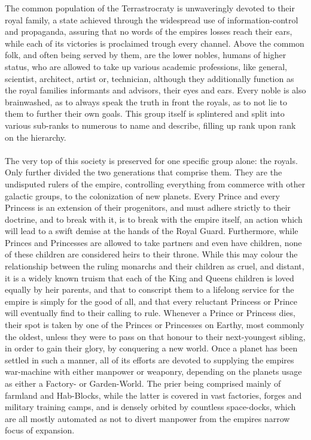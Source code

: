 \documentclass[a4paper,12pt]{report}
\begin{document}
The common population of the Terrastrocraty is unwaveringly devoted to their royal family, a state achieved through the widespread use of information-control and propaganda, assuring that no words of the empires losses reach their ears, while each of its victories is proclaimed trough every channel. Above the common folk, and often being served by them, are the lower nobles, humans of higher status, who are allowed to take up various academic professions, like general, scientist, architect, artist or, technician, although they additionally function as the royal families informants and advisors, their eyes and ears. Every noble is also brainwashed, as to always speak the truth in front the royals, as to not lie to them to further their own goals. This group itself is splintered and split into various sub-ranks to numerous to name and describe, filling up rank upon rank on the hierarchy.\\
\\
The very top of this society is preserved for one specific group alone: the royals. Only further divided the two generations that comprise them. They are the undisputed rulers of the empire, controlling everything from commerce with other galactic groups, to the colonization  of new planets. Every Prince and every Princess is an extension of their progenitors, and must adhere strictly to their doctrine, and to break with it, is to break with the empire itself, an action which will lead to a swift demise at the hands of the Royal Guard. Furthermore, while Princes and Princesses are allowed to take partners and even have children, none of these children are considered heirs to their throne. While this may colour the relationship between the ruling monarchs and their children as cruel, and distant, it is a widely known truism that each of the King and Queens children is loved equally by heir parents, and that to conscript them to a lifelong service for the empire is simply for the good of all, and that every reluctant Princess or Prince will eventually find to their calling to rule. Whenever a Prince or Princess dies, their spot is taken by one of the Princes or Princesses on Earthy, most commonly the oldest, unless they were to pass on that honour to their next-youngest sibling, in order to gain their glory, by conquering a new world. Once a planet has been settled in such a manner, all of its efforts are devoted to supplying the empires war-machine with either manpower or weaponry, depending on the planets usage as either a Factory- or Garden-World. The prier being comprised mainly of farmland and Hab-Blocks, while the latter is covered in vast factories, forges and military training camps, and is densely orbited by countless space-docks, which are all mostly automated as not to divert manpower from the empires narrow focus of expansion.\\
\end{document}
